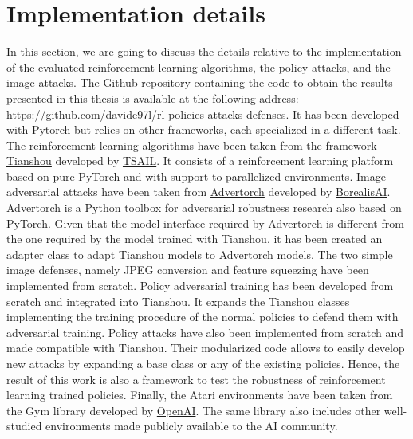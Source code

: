 \section{Implementation details}
In this section, we are going to discuss the details relative to the implementation of the evaluated reinforcement learning algorithms, the policy attacks, and the image attacks. The Github repository containing the code to obtain the results presented in this thesis is available at the following address: \url{https://github.com/davide97l/rl-policies-attacks-defenses}. It has been developed with Pytorch but relies on other frameworks, each specialized in a different task. The reinforcement learning algorithms have been taken from the framework \href{https://github.com/davide97l/rl-policies-attacks-defenses}{Tianshou} \cite{tianshou} developed by \href{http://ml.cs.tsinghua.edu.cn/}{TSAIL}. It consists of a reinforcement learning platform based on pure PyTorch and with support to parallelized environments. Image adversarial attacks have been taken from \href{https://github.com/BorealisAI/advertorch}{Advertorch} \cite{ding2019advertorch} developed by \href{https://www.borealisai.com/en/}{BorealisAI}. Advertorch is a Python toolbox for adversarial robustness research also based on PyTorch. Given that the model interface required by Advertorch is different from the one required by the model trained with Tianshou, it has been created an adapter class to adapt Tianshou models to Advertorch models. The two simple image defenses, namely JPEG conversion and feature squeezing have been implemented from scratch. Policy adversarial training has been developed from scratch and integrated into Tianshou. It expands the Tianshou classes implementing the training procedure of the normal policies to defend them with adversarial training. Policy attacks have also been implemented from scratch and made compatible with Tianshou. Their modularized code allows to easily develop new attacks by expanding a base class or any of the existing policies. Hence, the result of this work is also a framework to test the robustness of reinforcement learning trained policies. Finally, the Atari environments have been taken from the Gym library developed by \href{https://openai.com/}{OpenAI}. The same library also includes other well-studied environments made publicly available to the AI community.